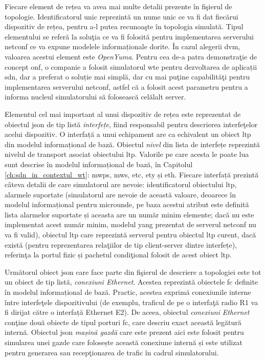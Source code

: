 Fiecare element de rețea va avea mai multe detalii prezente în fişierul de topologie. Identificatorul unic reprezintă un nume unic ce va fi dat fiecărui dispozitiv de rețea, pentru a-l putea recunoaşte în topologia simulată. Tipul elementului se referă la soluţia ce va fi folosită pentru implementarea serverului \gls{netconf} ce va expune modelele informaționale dorite. În cazul alegerii \gls{dvm}, valoarea acestui element este \textit{OpenYuma}. Pentru cea de-a patra demonstraţie de concept \gls{onf}, o companie a folosit simulatorul \gls{wte} pentru dezvoltarea de aplicații \gls{sdn}, dar a preferat o soluție mai simplă, dar cu mai puţine capabilităţi pentru implementarea serverului \gls{netconf}, astfel că a folosit acest parametru pentru a informa nucleul simulatorului să folosească celălalt server. 

Elementul cel mai important al unui dispozitiv de rețea este reprezentat de obiectul \gls{json} de tip listă \textit{interfețe}, fiind responsabil pentru descrierea interfeţelor acelui dispozitiv. O interfață a unui echipament are ca echivalent un obiect \gls{ltp} din modelul informațional de bază. Obiectul \textit{nivel} din lista de interfețe reprezintă nivelul de transport asociat obiectului \gls{ltp}. Valorile pe care acesta le poate lua sunt descrise în modelul informațional de bază, în Capitolul \ref{ch:sdn_in_contextul_wt}: \gls{mwps}, \gls{mws}, \gls{etc}, \gls{ety} și \gls{eth}. Fiecare interfață prezintă câteva detalii de care simulatorul are nevoie: identificatorul obiectului \gls{ltp}, alarmele suportate (simulatorul are nevoie de această valoare, deoarece în modelul informațional pentru microunde, pe baza acestui atribut este definită lista alarmelor suportate și aceasta are un număr minim elemente; dacă nu este implementat acest număr minim, modelul \gls{yang} prezentat de serverul \gls{netconf} nu va fi valid), obiectul \gls{ltp} care reprezintă serverul pentru obiectul \gls{ltp} curent, dacă există (pentru reprezentarea relaţiilor de tip client-server dintre interfețe), referinţa la portul fizic și pachetul condiţional folosit de acest obiect \gls{ltp}.

Următorul obiect \gls{json} care face parte din fişierul de descriere a topologiei este tot un obiect de tip listă, \textit{conexiuni Ethernet}. Acestea reprezintă obiectele \gls{fc} definite în modelul informațional de bază. Practic, acestea exprimă conexiunile interne între interfeţele dispozitivului (de exemplu, traficul de pe o interfaţă radio R1 va fi dirijat către o interfață Ethernet E2). De aceea, obiectul \textit{conexiuni Ethernet} conţine două obiecte de tipul porturi \gls{fc}, care descriu exact această legătură internă. Obiectul \gls{json} \textit{mașină gazdă} care este prezent aici este folosit pentru simularea unei gazde care folosește această conexiune internă și este utilizat pentru generarea sau recepţionarea de trafic în cadrul simulatorului.

